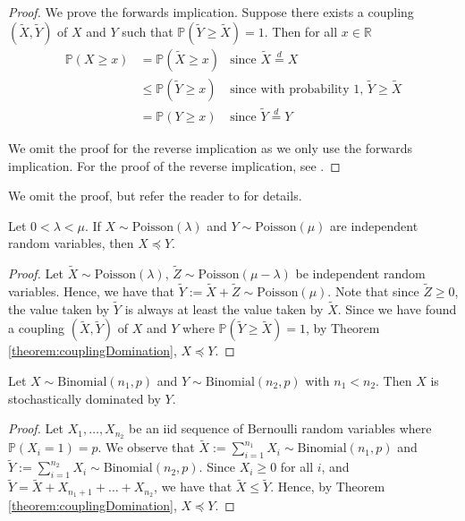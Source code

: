 \begin{proof}
	We prove the forwards implication. Suppose there exists a coupling $(\tilde{X}, \tilde{Y})$ of $X$ and $Y$ such that $\mathbb{P}(\tilde{Y} \geq \tilde{X}) = 1$. Then for all $x \in \mathbb{R}$
	\begin{align*}
		\mathbb{P}(X \geq x) &= \mathbb{P}(\tilde{X} \geq x) & \text{since } \tilde{X} \stackrel{d}{=} X \\
		&\leq \mathbb{P}(\tilde{Y} \geq x) & \text{since with probability 1, } \tilde{Y} \geq \tilde{X} \\
		&= \mathbb{P}(Y \geq x) & \text{since } \tilde{Y} \stackrel{d}{=} Y 
	\end{align*}

	We omit the proof for the reverse implication as we only use the forwards implication. For the proof of the reverse implication, see \cite{coupling}.
\end{proof}


We omit the proof, but refer the reader to \cite{coupling} for details.

\begin{theorem}
	Let $0 < \lambda < \mu$. If $X \sim \text{Poisson}(\lambda)$ and $Y \sim \text{Poisson}(\mu)$ are independent random variables, then $X \preceq Y$. 
\end{theorem}

\begin{proof}
	Let $\tilde{X} \sim \text{Poisson}(\lambda)$, $\tilde{Z} \sim \text{Poisson}(\mu - \lambda)$ be independent random variables. Hence, we have that $\tilde{Y} := \tilde{X} + \tilde{Z} \sim \text{Poisson}(\mu)$. Note that since $\tilde{Z} \geq 0$, the value taken by $\tilde{Y}$ is always at least the value taken by $\tilde{X}$. Since we have found a coupling $(\tilde{X}, \tilde{Y})$ of $X$ and $Y$ where $\mathbb{P}(\tilde{Y} \geq \tilde{X}) = 1$, by Theorem \ref{theorem:couplingDomination}, $X \preceq Y$.
\end{proof}

\begin{theorem}
	Let $X \sim \text{Binomial}(n_1, p)$ and $Y \sim \text{Binomial}(n_2, p)$ with $n_1 < n_2$. Then $X$ is stochastically dominated by $Y$.
\end{theorem}

\begin{proof}
	Let $X_1, \dots, X_{n_2}$ be an iid sequence of Bernoulli random variables where $\mathbb{P}(X_i = 1) = p$. We observe that $\tilde{X} := \sum_{i=1}^{n_1} X_i \sim \text{Binomial}(n_1, p)$ and $\tilde{Y} := \sum_{i=1}^{n_2} X_i \sim \text{Binomial}(n_2, p)$. Since $X_i \geq 0$ for all $i$, and $\tilde{Y} = \tilde{X} + X_{n_1 + 1} + \dots + X_{n_2}$, we have that $\tilde{X} \leq \tilde{Y}$. Hence, by Theorem \ref{theorem:couplingDomination}, $X \preceq Y$.
\end{proof}


